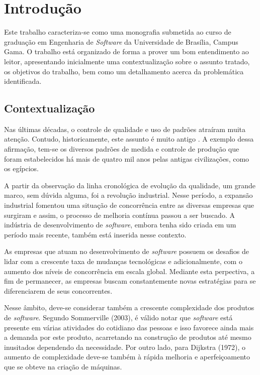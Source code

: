 \chapter{Introdução}

Este trabalho caracteriza-se como uma monografia submetida ao curso de graduação em Engenharia de \textit{Software} da Universidade de Brasília, Campus Gama. O trabalho está organizado de forma a prover um bom entendimento ao leitor, apresentando inicialmente uma contextualização sobre o assunto tratado, os objetivos do trabalho, bem como um detalhamento acerca da problemática identificada.

\section{Contextualização}

Nas últimas décadas, o controle de qualidade e uso de padrões atraíram muita atenção. Contudo, historicamente, este assunto é muito antigo \cite{qualidadesoftware}. A exemplo dessa afirmação, tem-se os diversos padrões de medida e controle de produção que foram estabelecidos há mais de quatro mil anos pelas antigas civilizações, como os egípcios.

A partir da observação da linha cronológica de evolução da qualidade, um grande marco, sem dúvida alguma, foi a revolução industrial. Nesse período, a expansão industrial fomentou uma situação de concorrência entre as diversas empresas que surgiram e assim, o processo de melhoria contínua passou a ser buscado. A indústria de desenvolvimento de \textit{software}, embora tenha sido criada em um período mais recente, também está inserida nesse contexto.

As empresas que atuam no desenvolvimento de \textit{software} possuem os desafios de lidar com a crescente taxa de mudanças tecnológicas e adicionalmente, com o aumento dos níveis de concorrência em escala global. Mediante esta perpectiva, a fim de permanecer, as empresas buscam constantemente novas estratégias para se diferenciarem de seus concorrentes.

Nesse âmbito, deve-se considerar também a crescente complexidade dos produtos de \textit{software}. Segundo Sommerville (2003), é válido notar que \textit{software} está presente em várias atividades do cotidiano das pessoas e isso favorece ainda mais a demanda por este produto, acarretando na construção de produtos até mesmo inusitados dependendo da necessidade. Por outro lado, para Dijkstra (1972), o aumento de complexidade deve-se também à rápida melhoria e aperfeiçoamento que se obteve na criação de máquinas.

